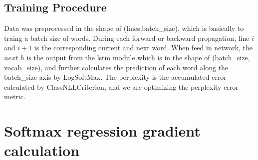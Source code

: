 \documentclass{article}
\begin{document}
\subsection{Training Procedure}
Data was preprocessed in the shape of (lines,batch\_size), which is basically to traing a batch size of words. During each forward or backward propagation, line $i$ and $i+1$ is the corresponding current and next word. When feed in network, the $next\_h$ is the output from the lstm module which is in the shape of (batch\_size, vocab\_size), and further calculates the prediction of each word along the batch\_size axis by LogSoftMax. The perplexity is the accumulated error calculated by ClassNLLCriterion, and we are optimizing the perplexity error metric.


\section{Softmax regression gradient calculation}
\end{document}

